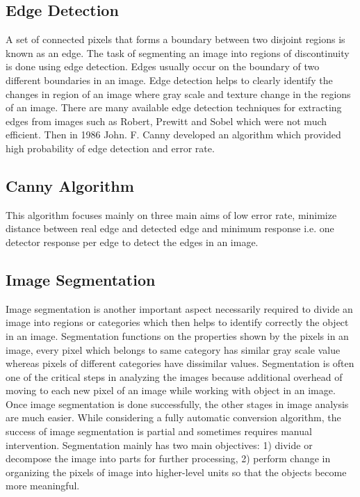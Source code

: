 \documentclass{article}
\begin{document}
\subsection{Edge Detection}
A set of connected pixels that forms a boundary between two
disjoint regions is known as an edge. The task of segmenting
an image into regions of discontinuity is done using edge
detection. Edges usually occur on the boundary of two
different boundaries in an image. Edge detection helps to
clearly identify the changes in region of an image where gray
scale and texture change in the regions of an image. There
are many available edge detection techniques for extracting
edges from images such as Robert, Prewitt and Sobel which
were not much efficient. Then in 1986 John. F. Canny
developed an algorithm which provided high probability of
edge detection and error rate.
\subsection{Canny Algorithm}
This algorithm focuses mainly on three main aims of low
error rate, minimize distance between real edge and detected
edge and minimum response i.e. one detector response per
edge to detect the edges in an image.
\subsection{ Image Segmentation}
Image segmentation is another important aspect necessarily
required to divide an image into regions or categories which
then helps to identify correctly the object in an image.
Segmentation functions on the properties shown by the pixels
in an image, every pixel which belongs to same category has
similar gray scale value whereas pixels of different categories
have dissimilar values. Segmentation is often one of the
critical steps in analyzing the images because additional
overhead of moving to each new pixel of an image while
working with object in an image. Once image segmentation is
done successfully, the other stages in image analysis are
much easier. While considering a fully automatic conversion
algorithm, the success of image segmentation is partial and
sometimes requires manual intervention. Segmentation
mainly has two main objectives: 1) divide or decompose the
image into parts for further processing, 2) perform change in
organizing the pixels of image into higher-level units so that
the objects become more meaningful.



\newpage
\end{document}
